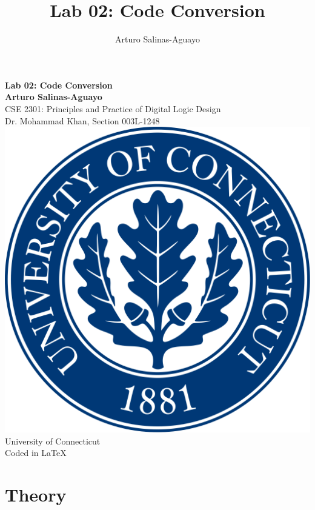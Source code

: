 \documentclass[12pt]{report}
\author{Arturo Salinas-Aguayo}
\title{Lab 02: Code Conversion}
\begin{document}
\newcommand{\closure}[2][3]{%
	{}\mkern#1mu\overline{\mkern-#1mu#2}}
\newcommand\ncoverline[1]{\mkern1mu\overline{\mkern-1mu#1\mkern-1mu}\mkern1mu}
\begin{titlepage}
	\centering
	\vspace*{3cm}
	\huge\textbf{Lab 02: Code Conversion}\\
	\vspace{5cm}
	\Large\textbf{Arturo Salinas-Aguayo}\\
	\normalsize
	CSE 2301: Principles and Practice of Digital Logic Design\\
	Dr. Mohammad Khan, Section 003L-1248\\
	\vfill
	\includegraphics[scale=0.1]{uconnlogo}\\
	University of Connecticut\\
	\tiny{Coded in \LaTeX}
	\vspace*{1cm}
\end{titlepage}
\section*{Theory}
\end{document}
